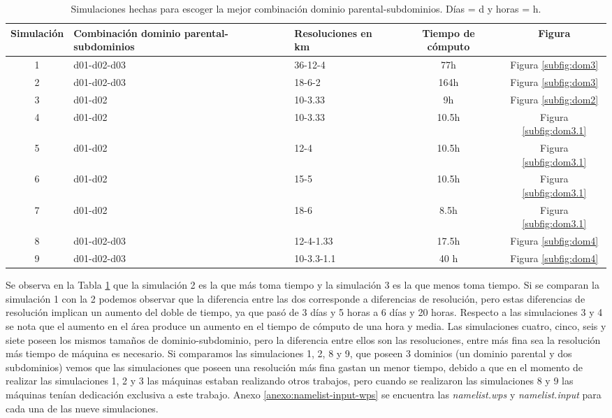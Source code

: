 \begin{table}[H]
\caption{Simulaciones hechas para escoger la mejor combinación dominio parental-subdominios. Días = d y horas = h.}
\label{tabla:dominios_1}
\begin{center}
\begin{tabular}{c|p{5cm}p{2cm}cc}
Simulación & Combinación dominio parental-subdominios     & Resoluciones en km & Tiempo de cómputo & Figura  \\ \hline
1    & d01-d02-d03 & 36-12-4    & 77h & Figura \ref{subfig:dom3}\\ %
2    & d01-d02-d03 & 18-6-2     & 164h& Figura \ref{subfig:dom3}\\ %
3    & d01-d02     & 10-3.33     & 9h & Figura \ref{subfig:dom2}\\
4    & d01-d02     & 10-3.33     & 10.5h & Figura \ref{subfig:dom3.1}\\
5    & d01-d02     & 12-4     & 10.5h    & Figura \ref{subfig:dom3.1}   \\
6    & d01-d02     & 15-5    & 10.5h     & Figura \ref{subfig:dom3.1}  \\
7    & d01-d02     & 18-6     & 8.5h     & Figura \ref{subfig:dom3.1}  \\
8    & d01-d02-d03 & 12-4-1.33   & 17.5h &Figura \ref{subfig:dom4}\\
9    & d01-d02-d03 & 10-3.3-1.1  & 40 h &Figura \ref{subfig:dom4}
\end{tabular}
\end{center}

\end{table}

Se observa en la Tabla \ref{tabla:dominios_1} que la simulación 2 es la que más toma tiempo y la simulación 3 es la que menos toma tiempo. Si se comparan la simulación 1 con la 2 podemos observar que la diferencia entre las dos corresponde a diferencias de resolución, pero estas diferencias de resolución implican un aumento del doble de tiempo, ya que pasó de 3 días y 5 horas a 6 días y 20 horas. Respecto a las simulaciones 3 y 4 se nota que el aumento en el área produce un aumento en el tiempo de cómputo de una hora y media. Las simulaciones cuatro, cinco, seis y siete poseen los mismos tamaños de dominio-subdominio, pero la diferencia entre ellos son las resoluciones, entre más fina sea la resolución más tiempo de máquina es necesario. Si comparamos las simulaciones 1, 2, 8 y 9, que poseen 3 dominios (un dominio parental y dos subdominios) vemos que las simulaciones que poseen una resolución más fina gastan un menor tiempo, debido a que en el momento de realizar las simulaciones 1, 2 y 3 las máquinas estaban realizando otros trabajos, pero cuando se realizaron las simulaciones 8 y 9 las máquinas tenían dedicación exclusiva a este trabajo. Anexo \ref{anexo:namelist-input-wps} se encuentra las \textit{namelist.wps} y \textit{namelist.input} para cada una de las nueve simulaciones.




